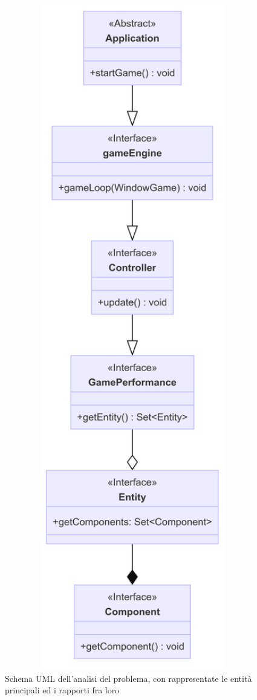 \documentclass[a4paper,12pt]{report}
\begin{document}
\begin{figure}[H]
\includegraphics[width=1\textwidth]{img/analisi.png} 
\centering{}
\caption{Schema UML dell'analisi del problema, con rappresentate le entità principali ed i rapporti fra loro}
\label{img:analisi}
\end{figure}
\end{document}
